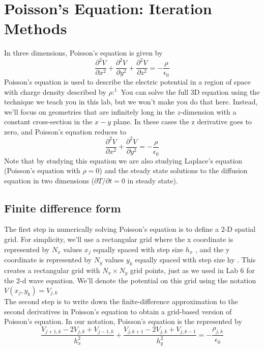 
\chapter*{Poisson\rq s Equation: Iteration Methods}
In three dimensions, Poisson\rq s equation is given by
\begin{equation}\label{eq:91}
\frac{\partial^{2} V}{\partial x^{2}}+\frac{\partial^{2} V}{\partial y^{2}}+\frac{\partial^{2} V}{\partial z^{2}}=-\frac{\rho}{\epsilon_{0}}
\end{equation}
Poisson\rq s equation is used to describe the electric potential in a region of space
with charge density described by $ρ:^1$ You can solve the full 3D equation using
the technique we teach you in this lab, but we won’t make you do that here.
Instead, we’ll focus on geometries that are infinitely long in the $z$-dimension with
a constant cross-section in the $x - y$ plane. In these cases the z derivative goes to
zero, and Poisson\rq s equation reduces to
\begin{equation}\label{eq:92}
\frac{\partial^{2} V}{\partial x^{2}}+\frac{\partial^{2} V}{\partial y^{2}}=-\frac{\rho}{\epsilon_{0}}
\end{equation}
Note that by studying this equation we are also studying Laplace\rq s equation (Poisson\rq s equation with $\rho = 0$) and the steady state solutions to the diffusion equation
in two dimensions ($\partial T / \partial t = 0$ in steady state).


\section*{Finite difference form}
The first step in numerically solving Poisson\rq s equation is to define a 2-D spatial grid. For simplicity, we\rq ll use a rectangular grid where the x coordinate is represented by $N_x$ values $x_j$ equally spaced with step size $h_x$ , and the y coordinate is represented by $N_y$ values $y_k$ equally spaced with step size hy . This
creates a rectangular grid with $N_x × N_y$ grid points, just as we used in Lab 6 for
the 2-d wave equation. We\rq ll denote the potential on this grid using the notation $V(x_j,y_k) = V_{j,k}$ \\
The second step is to write down the finite-difference approximation to the
second derivatives in Poisson\rq s equation to obtain a grid-based version of Poisson\rq s
equation. In our notation, Poisson\rq s equation is the represented by
\begin{equation}\label{eq:93}
\frac{V_{j+1, k}-2 V_{j, k}+V_{j-1, k}}{h_{x}^{2}}+\frac{V_{j, k+1}-2 V_{j, k}+V_{j, k-1}}{h_{y}^{2}}=-\frac{\rho_{j, k}}{\epsilon_{0}}
\end{equation}

